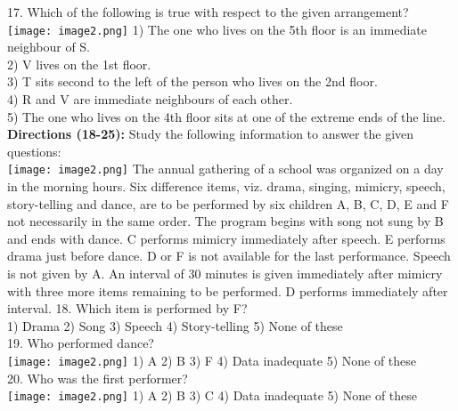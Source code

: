 \documentclass[
]{article}
\begin{document}
17. Which of the following is true with respect to the given arrangement?\\
\texttt{[image: image2.png]}
1) The one who lives on the 5th floor is an immediate neighbour of S.\\
2) V lives on the 1st floor.\\
3) T sits second to the left of the person who lives on the 2nd floor.\\
4) R and V are immediate neighbours of each other.\\
5) The one who lives on the 4th floor sits at one of the extreme ends of the line.\\

\textbf{Directions (18-25):} Study the following information to answer the given questions:\\
\texttt{[image: image2.png]}
The annual gathering of a school was organized on a day in the morning hours. Six difference
items, viz. drama, singing, mimicry, speech, story-telling and dance, are to be performed by six
children A, B, C, D, E and F not necessarily in the same order. The program begins with song
not sung by B and ends with dance. C performs mimicry immediately after speech. E performs
drama just before dance. D or F is not available for the last performance. Speech is not given by
A. An interval of 30 minutes is given immediately after mimicry with three more items
remaining to be performed. D performs immediately after interval.
18. Which item is performed by F?\\
1) Drama \hspace{2mm}2) Song \hspace{2mm}3) Speech \hspace{2mm}4) Story-telling \hspace{2mm}5) None of these\\

19. Who performed dance?\\
\texttt{[image: image2.png]}
1) A \hspace{2mm}2) B \hspace{2mm}3) F
\hspace{2mm}4) Data inadequate \hspace{2mm}5) None of these\\

20. Who was the first performer?\\
\texttt{[image: image2.png]}
1) A \hspace{2mm}2) B \hspace{2mm}3) C
\hspace{2mm}4) Data inadequate \hspace{2mm}5) None of these\\
\end{document}
